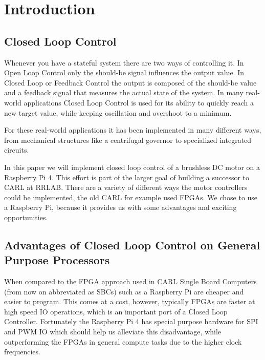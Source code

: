 \chapter{Introduction}
\label{chap:introduction}

\section{Closed Loop Control}
\label{sec:introduction:clc}

Whenever you have a stateful system there are two ways of controlling it.
In Open Loop Control only the should-be signal influences the output value.
In Closed Loop or Feedback Control the output is composed of the should-be value and a feedback signal that measures the actual state of the system.
In many real-world applications Closed Loop Control is used for its ability to quickly reach a new target value, while keeping oscillation and overshoot to a minimum.

For these real-world applications it has been implemented in many different ways,
from mechanical structures like a centrifugal governor to specialized integrated circuits.

In this paper we will implement closed loop control of a brushless DC motor on a Raspberry Pi 4.
This effort is part of the larger goal of building a successor to CARL \cite{CARL} at RRLAB.
There are a variety of different ways the motor controllers could be implemented, the old CARL for example used FPGAs.
We chose to use a Raspberry Pi, because it provides us with some advantages and exciting opportunities.

\section{Advantages of Closed Loop Control on General Purpose Processors}
\label{sec:introduction:gpp}

When compared to the FPGA approach used in CARL Single Board Computers (from now on abbreviated as SBCs) such as a Raspberry Pi are cheaper and easier to program.
This comes at a cost, however, typically FPGAs are faster at high speed IO operations, which is an important port of a Closed Loop Controller.
Fortunately the Raspberry Pi 4 has special purpose hardware for SPI and PWM IO which should help us alleviate this disadvantage,
while outperforming the FPGAs in general compute tasks due to the higher clock frequencies.

